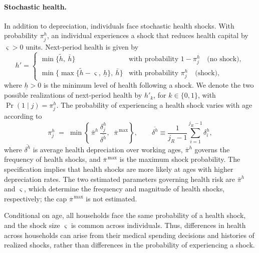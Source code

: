 \documentclass[12pt,a4paper]{article}
\begin{document}
\paragraph{Stochastic health.}
In addition to depreciation, individuals face stochastic health shocks. With probability $\pi^h_j$, an individual experiences a shock that reduces health capital by $\varsigma > 0$ units. Next-period health is given by
\begin{equation}
\label{eq:health_lom_shock}
h' =
\begin{cases}
\min\{\tilde h,\ \bar h\}
  & \text{with probability } 1 - \pi^h_j \quad \text{(no shock)},\\[4pt]
\min\bigl\{\max\{\tilde h - \varsigma,\ \underline h\},\ \bar h\bigr\}
  & \text{with probability } \pi^h_j \quad \text{(shock)},
\end{cases}
\end{equation}
where $\underline h > 0$ is the minimum level of health following a shock. We denote the two possible realizations of next-period health by $h'_k$, for $k \in \{0,1\}$, with $\Pr(1 \mid j) = \pi^h_j$. The probability of experiencing a health shock varies with age according to
\begin{equation}
\label{eq:shock_prob}
\pi^h_j \;=\; \min\!\left\{\,\bar\pi^h\,
   \frac{\delta^h_j}{\overline{\delta^h}}, \;\; \overline{\pi}^{\,\max} \right\},
\qquad
\overline{\delta^h} \equiv \frac{1}{j_R-1}\sum_{i=1}^{j_R-1} \delta^h_i ,
\end{equation}
where $\overline{\delta^h}$ is average health depreciation over working ages, $\bar\pi^h$ governs the frequency of health shocks, and $\overline{\pi}^{\,\max}$ is the maximum shock probability. The specification implies that health shocks are more likely at ages with higher depreciation rates. The two estimated parameters governing health risk are $\bar\pi^h$ and $\varsigma$, which determine the frequency and magnitude of health shocks, respectively; the cap $\overline{\pi}^{\,\max}$ is not estimated.

Conditional on age, all households face the same probability of a health shock, and the shock size $\varsigma$ is common across individuals. Thus, differences in health across households can arise from their medical spending decisions and histories of realized shocks, rather than differences in the probability of experiencing a shock.
\end{document}
